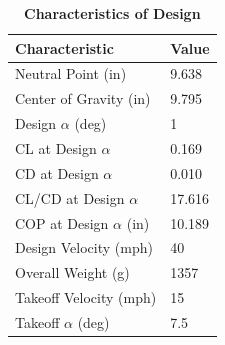     \begin{table}[H]
        \begin{center}
        \caption{\textbf{Characteristics of Design}} \label{table:Weights}
        \begin{tabular}{|p{1.4in}|p{1in}|} %
        \hline
            \textbf{Characteristic} & \textbf{Value} \\ \hline
            Neutral Point (in) & 9.638 \\ \hline
            Center of Gravity (in) & 9.795 \\ \hline
            Design $\alpha$ (deg) & 1 \\ \hline
            CL at Design $\alpha$ & 0.169 \\ \hline
            CD at Design $\alpha$ & 0.010 \\ \hline
            CL/CD at Design $\alpha$ & 17.616 \\ \hline
            COP at Design $\alpha$ (in) & 10.189 \\ \hline
            Design Velocity (mph) & 40 \\ \hline
            Overall Weight (g) & 1357 \\ \hline
            Takeoff Velocity (mph) & 15 \\ \hline
            Takeoff $\alpha$ (deg) & 7.5 \\ \hline
        \end{tabular}
        \end{center}
    \end{table}

